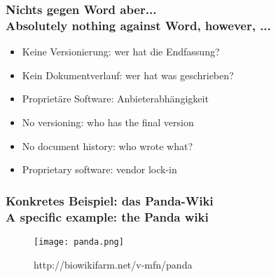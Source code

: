 \documentclass[13pt]{beamer}
\begin{document}
\begin{frame}
  \frametitle{Nichts gegen Word\textsuperscript{\tiny\textregistered} aber... \\
    \textcolor{mfn_green}{Absolutely nothing against Word\textsuperscript{\tiny\textregistered}, however, ...}}
  \begin{itemize}
  \item{Keine Versionierung: wer hat die Endfassung?}
  \item{Kein Dokumentverlauf: wer hat was geschrieben?}
  \item{Proprietäre Software: Anbieterabhängigkeit}
  \end{itemize}
  
  \begin{itemize}
  \item{\textcolor{mfn_green}{No versioning: who has the final version}}
  \item{\textcolor{mfn_green}{No document history: who wrote what?}}
  \item{\textcolor{mfn_green}{Proprietary software: vendor lock-in}}
  \end{itemize}
\end{frame}

%
%

\begin{frame}
  \frametitle{Konkretes Beispiel: das Panda-Wiki\\\textcolor{mfn_green}{A specific example: the Panda wiki}}
  \begin{figure}
    \texttt{[image: panda.png]}
    \caption{http://biowikifarm.net/v-mfn/panda}
  \end{figure}
\end{frame}
\end{document}
